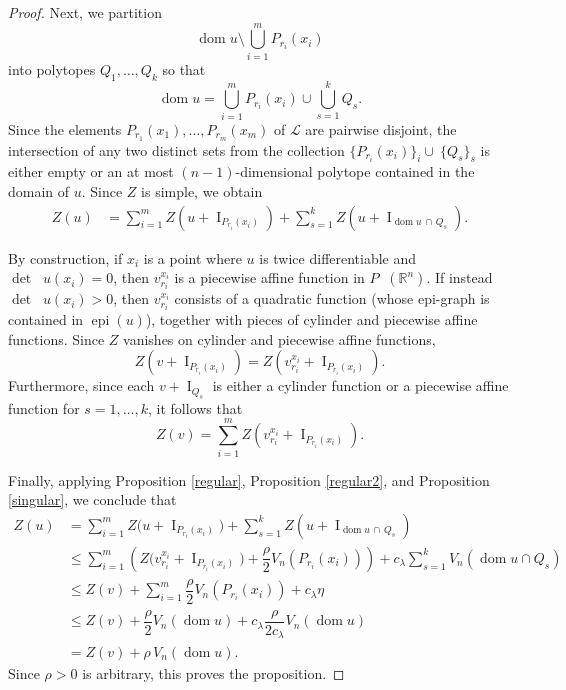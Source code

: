 \documentclass[11pt]{article}
\theoremstyle{definition} %
\newcommand{\RR}{(\mathbb{R}^n)}
\DeclareMathOperator{\I}{I}
\DeclareMathOperator{\LQ}{_{l.q}}
\DeclareMathOperator{\dom}{dom}
\DeclareMathOperator{\D}{D^2}
\DeclareMathOperator{\epi}{epi}
\begin{document}
\begin{proof}
Next, we partition
$$\dom u\setminus \bigcup_{i=1}^mP_{r_i}(x_i)$$
into polytopes $Q_1, \dots, Q_k$ so that
$$\dom u= \bigcup_{i=1}^mP_{r_i}(x_i)\cup \bigcup_{s=1}^k Q_s.$$
Since the elements $P_{r_1}(x_1), \dots, P_{r_m}(x_m)$ of $\mathcal{L}$ are pairwise disjoint, the intersection of any two distinct sets from the 
collection $\{P_{r_i}(x_i)\}_i\cup~\{Q_s\}_s$   is either empty or an at most $(n-1)$-dimensional polytope contained in the domain of $ u$.   Since $Z$ is simple, we obtain
\begin{align*}
    Z(u)&= \sum_{i=1}^m Z(u+\I_{P_{r_i}(x_i)})+\sum_{s=1}^k Z(u+\I_{ \dom u\,\cap\, Q_s}).
\end{align*}

 

By construction, if $x_i$ is a point where $u$ is twice differentiable and  $\det \D u(x_i)=0$, then $v_{r_i}^{x_i}$ is a piecewise affine function in $P\LQ\RR$.  
If instead $\det\D u(x_i)>0$, then $v_{r_i}^{x_i}$ consists of a quadratic function (whose epi-graph is contained in $\epi (u)$), together with pieces of 
cylinder and piecewise affine functions.  
Since $Z$ vanishes on cylinder and piecewise affine functions,
$$
Z(v+\I_{P_{r_i}(x_i)})= Z(v_{r_i}^{x_i}+\I_{P_{r_i}(x_i)}).
$$
Furthermore, since each $v+\I_{Q_s}$ is either a cylinder function 
or a piecewise affine function for $s = 1, \dots, k$, it follows that
$$
Z(v)= \sum_{i=1}^m Z(v_{r_i}^{x_i}+\I_{P_{r_i}(x_i)}).
$$




Finally, applying Proposition \ref{regular},  Proposition \ref{regular2}, and Proposition \ref{singular}, we conclude that
\begin{align*}
    Z(u)&= \sum_{i=1}^m Z\bigl(u+\I_{P_{r_i}(x_i)}\bigr)+\sum_{s=1}^k Z(u+\I_{ \dom u\,\cap \,Q_s})\\
    &\leq \sum_{i=1}^m\left( Z\bigl(v_{r_i}^{x_i}+\I_{P_{r_i}(x_i)}\bigr)+\dfrac{\rho}{2}V_n(P_{r_i}(x_i))\right)+c_{\lambda}\sum_{s=1}^k V_n(\dom u\cap Q_s)\\
    &\leq  Z(v) + \sum_{i=1}^m\dfrac{\rho}{2}V_n(P_{r_i}(x_i)) +c_{\lambda}\eta\\
    &\leq  Z(v) +  \dfrac{\rho}{2}V_n(\dom u)+c_{\lambda}\dfrac{\rho}{2c_{\lambda}} V_n(\dom u)\\
    &=  Z(v) +\rho \, V_n(\dom u).
\end{align*}
Since $\rho>0$ is arbitrary,  this proves the proposition. 
\end{proof}
\end{document}
